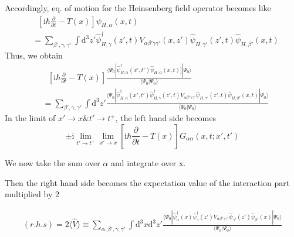 ﻿\documentclass[twoside]{book}
\numberwithin{equation}{section}
\begin{document}
Accordingly, eq. of motion for the Heinsenberg field operator becomes like 
\begin{align}
&\ \ \ [\mathrm{i}\hbar\frac{\partial}{\partial t}-T(x)]\psi_{H,\alpha}(x,t)\nonumber \\
&=\sum_{\beta',\gamma,\gamma'}\int \mathrm{d}^3z'\hat \psi^{\dagger}_{H,\gamma}(z',t)V_{\alpha\beta'\gamma\gamma'}(x,z')\hat \psi_{H,\gamma'}(z',t)\hat \psi_{H,\beta'}(x,t) \nonumber
\end{align}
Thus, we obtain 
\begin{align}\label{2.3.4}
&\ \ \ [\mathrm{i}\hbar\frac{\partial}{\partial t}-T(x)]\frac{\langle\Psi_0|\hat \psi^{
\dagger}_{H,\alpha}(x',t')\hat \psi_{H,\alpha} (x,t)]|\Psi_0\rangle}{\langle\Psi_0|\Psi_0\rangle}\nonumber \\
&=\sum_{\beta',\gamma,\gamma'}\int \mathrm{d}^3z'\frac{\langle\Psi_0|
\hat \psi^{\dagger}_{H,\alpha}(x',t')\hat \psi^{\dagger}_{H,\gamma}(z',t)V_{\alpha\beta'\gamma\gamma'}\hat\psi_{H,\gamma'}(z',t)\hat\psi_{H,\beta'}(x,t)
|\Psi_0\rangle}{\langle\Psi_0|\Psi_0\rangle} 
\end{align}
In the limit of $x' \rightarrow x \& t' \rightarrow t^+$, the left hand side becomes
\begin{equation}
\pm \mathrm{i} \lim_{t' \rightarrow t^+} \lim_{x' \rightarrow x} [\mathrm{i}\hbar\frac{\partial}{\partial t}-T(x)] G_{\alpha\alpha}(x,t;x',t') \nonumber
\end{equation}

We now take the sum over $\alpha$ and integrate over x.

Then the right hand side becomes the expectation value of the interaction part multiplied by 2

\begin{align}
(r.h.s)=2\langle\hat V\rangle \equiv \sum_{\alpha,\beta',\gamma,\gamma'}\int \mathrm{d}^3x\mathrm{d}^3z'\frac{\langle\Psi_0|
\hat \psi^{\dagger}_{\alpha}(x)\hat \psi^{\dagger}_{\gamma}(z')V_{\alpha\beta'\gamma\gamma'}\hat\psi_{\gamma'}(z')\hat\psi_{\beta'}(x)
|\Psi_0\rangle}{\langle\Psi_0|\Psi_0\rangle} \nonumber
\end{align}
\end{document}
